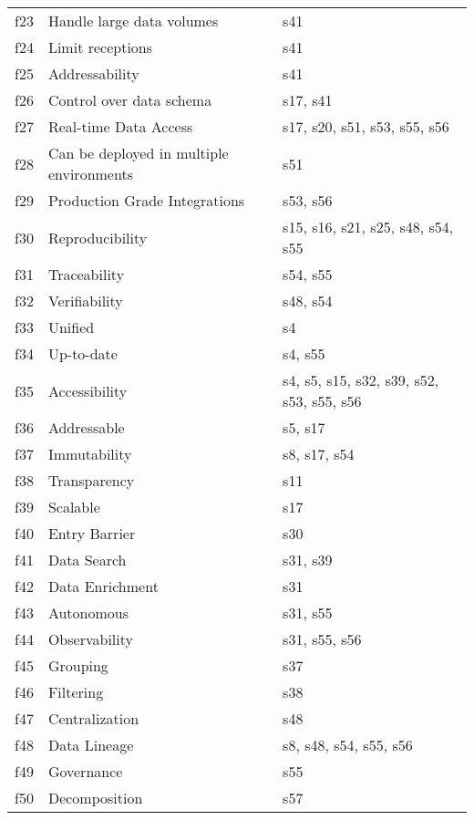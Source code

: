 \begin{tabular}{|c|p{}|p{}|}
f23 & Handle large data volumes & \cellcolor{emerald_shape_1} {s41}\\
f24 & Limit receptions & \cellcolor{emerald_shape_1} {s41}\\
f25 & Addressability & \cellcolor{emerald_shape_1} {s41}\\
f26 & Control over data schema & \cellcolor{emerald_shape_1} {s17, s41}\\
f27 & Real-time Data Access & \cellcolor{emerald_shape_3} {s17, s20, s51, s53, s55, s56}\\
f28 & Can be deployed in multiple environments & \cellcolor{emerald_shape_1} {s51}\\
f29 & Production Grade Integrations & \cellcolor{emerald_shape_1} {s53, s56}\\
f30 & Reproducibility & \cellcolor{emerald_shape_3} {s15, s16, s21, s25, s48, s54, s55}\\
f31 & Traceability & \cellcolor{emerald_shape_1} {s54, s55}\\
f32 & Verifiability & \cellcolor{emerald_shape_1} {s48, s54}\\
f33 & Unified & \cellcolor{emerald_shape_1} {s4}\\
f34 & Up-to-date & \cellcolor{emerald_shape_1} {s4, s55}\\
f35 & Accessibility & \cellcolor{emerald_shape_3} {s4, s5, s15, s32, s39, s52, s53, s55, s56}\\
f36 & Addressable & \cellcolor{emerald_shape_1} {s5, s17}\\
f37 & Immutability & \cellcolor{emerald_shape_2} {s8, s17, s54}\\
f38 & Transparency & \cellcolor{emerald_shape_1} {s11}\\
f39 & Scalable & \cellcolor{emerald_shape_1} {s17}\\
f40 & Entry Barrier & \cellcolor{emerald_shape_1} {s30}\\
f41 & Data Search & \cellcolor{emerald_shape_1} {s31, s39}\\
f42 & Data Enrichment & \cellcolor{emerald_shape_1} {s31}\\
f43 & Autonomous & \cellcolor{emerald_shape_1} {s31, s55}\\
f44 & Observability & \cellcolor{emerald_shape_2} {s31, s55, s56}\\
f45 & Grouping & \cellcolor{emerald_shape_1} {s37}\\
f46 & Filtering & \cellcolor{emerald_shape_1} {s38}\\
f47 & Centralization & \cellcolor{emerald_shape_1} {s48}\\
f48 & Data Lineage & \cellcolor{emerald_shape_3} {s8, s48, s54, s55, s56}\\
f49 & Governance & \cellcolor{emerald_shape_1} {s55}\\
f50 & Decomposition & \cellcolor{emerald_shape_1} {s57}\\
\hline
\end{tabular}
